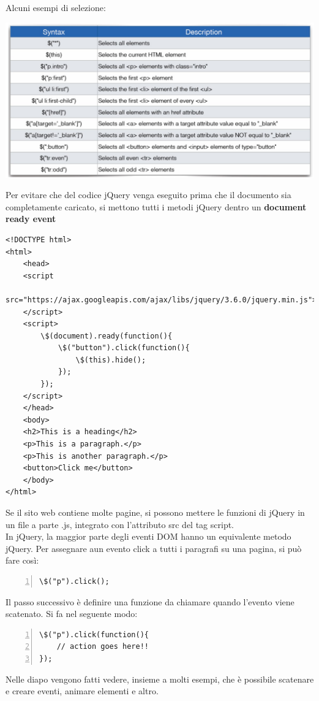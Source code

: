 Alcuni esempi di selezione:
\begin{center}
    \includegraphics[scale=0.4]{Images/TecnologieWeb/8/EsempijQuery.jpg}
\end{center}
Per evitare che del codice jQuery venga eseguito prima che il documento sia completamente caricato, si mettono tutti i metodi jQuery dentro un \textbf{document ready event}
\begin{Verbatim}[frame = single]
<!DOCTYPE html>
<html>
    <head>
    <script 
    src="https://ajax.googleapis.com/ajax/libs/jquery/3.6.0/jquery.min.js">
    </script>
    <script>
        \$(document).ready(function(){
            \$("button").click(function(){
                \$(this).hide();
            });
        });
    </script>
    </head>
    <body>
    <h2>This is a heading</h2>
    <p>This is a paragraph.</p>
    <p>This is another paragraph.</p>
    <button>Click me</button>
    </body>
</html>
\end{Verbatim}
Se il sito web contiene molte pagine, si possono mettere le funzioni di jQuery in un file a parte .js, integrato con l'attributo src del tag script. \\

In jQuery, la maggior parte degli eventi DOM hanno un equivalente metodo jQuery. Per assegnare aun evento click a tutti i paragrafi su una pagina, si può fare così:
\begin{Verbatim}[frame = single, numbers = left]
\$("p").click();
\end{Verbatim}
Il passo successivo è definire una funzione da chiamare quando l'evento viene scatenato. Si fa nel seguente modo:
\begin{Verbatim}[frame = single, numbers = left]
\$("p").click(function(){
    // action goes here!!
});
\end{Verbatim}
Nelle diapo vengono fatti vedere, insieme a molti esempi, che è possibile scatenare e creare eventi, animare elementi e altro. \\

